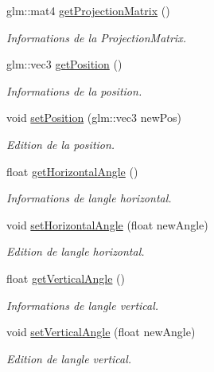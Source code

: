 \begin{DoxyCompactItemize}
glm\+::mat4 \hyperlink{classglimac_1_1Controls_aeb14a40e7d273aec1b6095d8bde08437}{get\+Projection\+Matrix} ()
\begin{DoxyCompactList}\small\item\em Informations de la Projection\+Matrix. \end{DoxyCompactList}\item 
glm\+::vec3 \hyperlink{classglimac_1_1Controls_a2f0ffddd68aec95f01abf802be75a686}{get\+Position} ()
\begin{DoxyCompactList}\small\item\em Informations de la position. \end{DoxyCompactList}\item 
void \hyperlink{classglimac_1_1Controls_a106c6381601ce5aace8ffdc0b4b7dd95}{set\+Position} (glm\+::vec3 new\+Pos)
\begin{DoxyCompactList}\small\item\em Edition de la position. \end{DoxyCompactList}\item 
float \hyperlink{classglimac_1_1Controls_ae96ae04755ebbcf8528d8299a637225f}{get\+Horizontal\+Angle} ()
\begin{DoxyCompactList}\small\item\em Informations de l\textquotesingle{}angle horizontal. \end{DoxyCompactList}\item 
void \hyperlink{classglimac_1_1Controls_a30b750a3e70f3a273a2abc6bc4932896}{set\+Horizontal\+Angle} (float new\+Angle)
\begin{DoxyCompactList}\small\item\em Edition de l\textquotesingle{}angle horizontal. \end{DoxyCompactList}\item 
float \hyperlink{classglimac_1_1Controls_a098df45aa771926c1b25e4ef2cdbf52a}{get\+Vertical\+Angle} ()
\begin{DoxyCompactList}\small\item\em Informations de l\textquotesingle{}angle vertical. \end{DoxyCompactList}\item 
void \hyperlink{classglimac_1_1Controls_a83626414d05716552bfe4a919ea0ff5c}{set\+Vertical\+Angle} (float new\+Angle)
\begin{DoxyCompactList}\small\item\em Edition de l\textquotesingle{}angle vertical. \end{DoxyCompactList}\item 

\end{DoxyCompactItemize}
